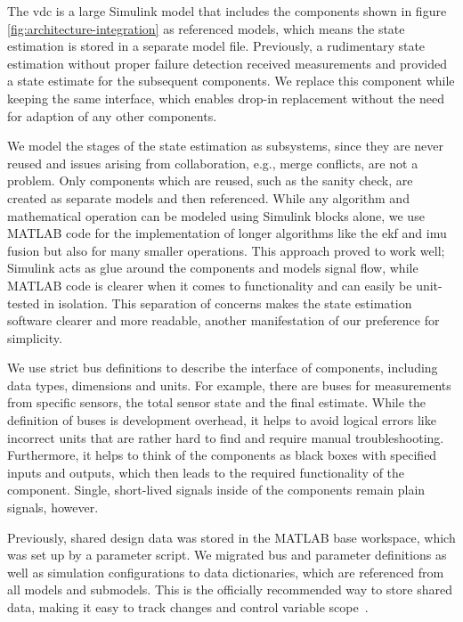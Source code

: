 The \gls{vdc} is a large Simulink model that includes the components shown in figure \ref{fig:architecture-integration} as referenced models, which means the state estimation is stored in a separate model file. Previously, a rudimentary state estimation without proper failure detection received measurements and provided a state estimate for the subsequent components. We replace this component while keeping the same interface, which enables drop-in replacement without the need for adaption of any other components.

We model the stages of the state estimation as subsystems, since they are never reused and issues arising from collaboration, e.g., merge conflicts, are not a problem. Only components which are reused, such as the sanity check, are created as separate models and then referenced. While any algorithm and mathematical operation can be modeled using Simulink blocks alone, we use MATLAB code for the implementation of longer algorithms like the \gls{ekf} and \gls{imu} fusion but also for many smaller operations. This approach proved to work well; Simulink acts as glue around the components and models signal flow, while MATLAB code is clearer when it comes to functionality and can easily be unit-tested in isolation. This separation of concerns makes the state estimation software clearer and more readable, another manifestation of our preference for simplicity.

We use strict bus definitions to describe the interface of components, including data types, dimensions and units. For example, there are buses for measurements from specific sensors, the total sensor state and the final estimate. While the definition of buses is development overhead, it helps to avoid logical errors like incorrect units that are rather hard to find and require manual troubleshooting. Furthermore, it helps to think of the components as black boxes with specified inputs and outputs, which then leads to the required functionality of the component. Single, short-lived signals inside of the components remain plain signals, however.

Previously, shared design data was stored in the MATLAB base workspace, which was set up by a parameter script. We migrated bus and parameter definitions as well as simulation configurations to data dictionaries, which are referenced from all models and submodels. This is the officially recommended way to store shared data, making it easy to track changes and control variable scope~\cite{TheMathWorksInc..2020b}.

